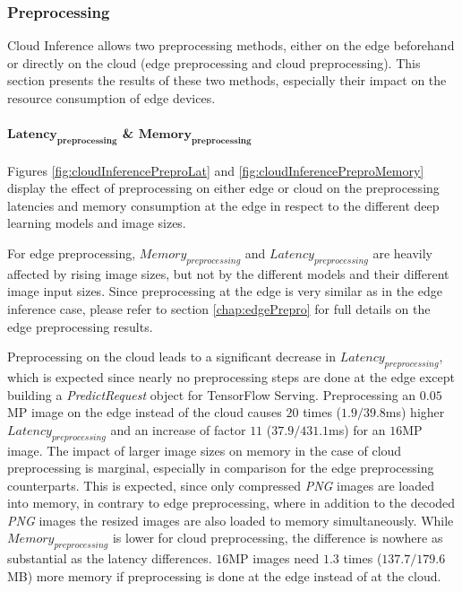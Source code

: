 \subsubsection{Preprocessing}
Cloud Inference allows two preprocessing methods, either on the edge beforehand or directly on the cloud (edge preprocessing and cloud preprocessing).
This section presents the results of these two methods, especially their impact on the resource consumption of edge devices.

\paragraph{$\mathbf{Latency_{preprocessing}}$ \& $\mathbf{Memory_{preprocessing}}$}
Figures \ref{fig:cloudInferencePreproLat} and \ref{fig:cloudInferencePreproMemory} display the effect of preprocessing on either edge or cloud on the preprocessing latencies and memory consumption at the edge in respect to the different deep learning models and image sizes.

For edge preprocessing, $Memory_{preprocessing}$ and $Latency_{preprocessing}$ are heavily affected by rising image sizes, but not by the different models and their different image input sizes.
Since preprocessing at the edge is very similar as in the edge inference case, please refer to section \ref{chap:edgePrepro} for full details on the edge preprocessing results.

Preprocessing on the cloud leads to a significant decrease in $Latency_{preprocessing}$, which is expected since nearly no preprocessing steps are done at the edge except building a \emph{PredictRequest} object for TensorFlow Serving.
Preprocessing an $0.05$MP image on the edge instead of the cloud causes $20$ times ($1.9/39.8$ms) higher $Latency_{preprocessing}$ and an increase of factor $11$ ($37.9/431.1$ms) for an $16$MP image.
The impact of larger image sizes on memory in the case of cloud preprocessing is marginal, especially in comparison for the edge preprocessing counterparts. This is expected, since only compressed \emph{PNG} images are loaded into memory, in contrary to edge preprocessing, where in addition to the decoded \emph{PNG} images the resized images are also loaded to memory simultaneously.
While $Memory_{preprocessing}$ is lower for cloud preprocessing, the difference is nowhere as substantial as the latency differences. $16$MP images need $1.3$ times ($137.7/179.6$MB) more memory if preprocessing is done at  the edge instead of at the cloud.

